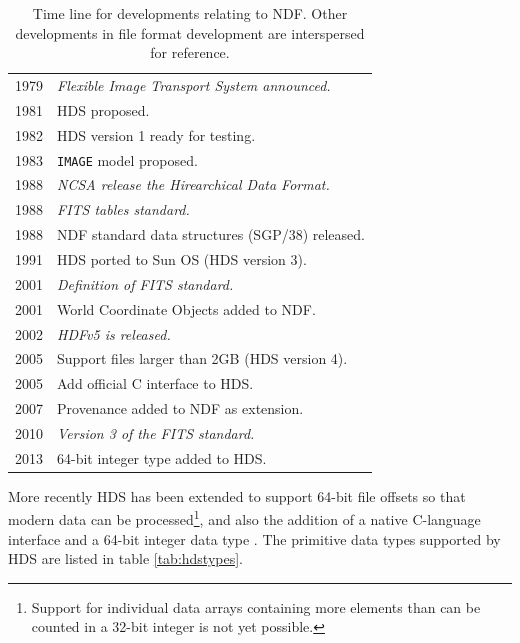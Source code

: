 \documentclass[final,authoryear,5p,times,twocolumn]{elsarticle}
\begin{document}
\begin{table}
\caption{Time line for developments relating to NDF. Other
  developments in file format development are interspersed
  for reference.}
\label{tab:timeline}
\begin{tabular}{|l|l|}
\hline
1979 & \emph{Flexible Image Transport System announced.}\\
1981 & HDS proposed. \\
1982 & HDS version 1 ready for testing. \\
1983 & \texttt{IMAGE} model proposed. \\
1988 & \emph{NCSA release the Hirearchical Data Format.}\\
1988 & \emph{FITS tables standard.}\\
1988 & NDF  standard data structures (SGP/38) released.\\
1991 & HDS ported to Sun OS (HDS version 3).\\
2001 & \emph{Definition of FITS standard.}\\
2001 & World Coordinate Objects added to NDF.\\
2002 & \emph{HDFv5 is released.}\\
2005 & Support files larger than 2GB (HDS version 4).\\
2005 & Add official C interface to HDS.\\
2007 & Provenance added to NDF as extension.\\
2010 & \emph{Version 3 of the FITS standard.}\\
2013 & 64-bit integer type added to HDS.\\
\hline
\end{tabular}
\begin{center}
\end{center}
\end{table}

More recently HDS has been extended to support 64-bit file
offsets so that modern data can be processed\footnote{Support for
  individual data  arrays containing more elements than can be counted
  in a 32-bit integer is not yet possible.}, and also the addition of
a native C-language interface and a 64-bit integer data type
\citep{P82_adassxxiii}. The primitive data types supported by HDS are
listed in table \ref{tab:hdstypes}.
\end{document}
